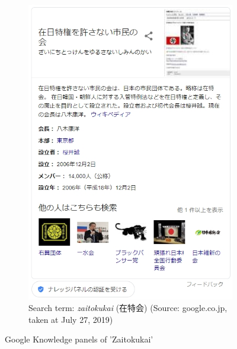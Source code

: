 \documentclass[10pt,british,A4paper,,openany]{memoir}
\begin{document}
\begin{figure}[!htb]
\begin{subfigure}[b]{0.40\textwidth}
  \includegraphics[width=\textwidth]{images/2channel/zaitokukaijp.jpg}
  \caption{Search term: \textit{zaitokukai} (在特会) (Source: google.co.jp, taken at July 27, 2019)}
  \label{fig:zaitokukaijp}
 \end{subfigure}
 \caption{Google Knowledge panels of 'Zaitokukai'}\label{fig:googlezaitokukai}
\end{figure}
\end{document}
